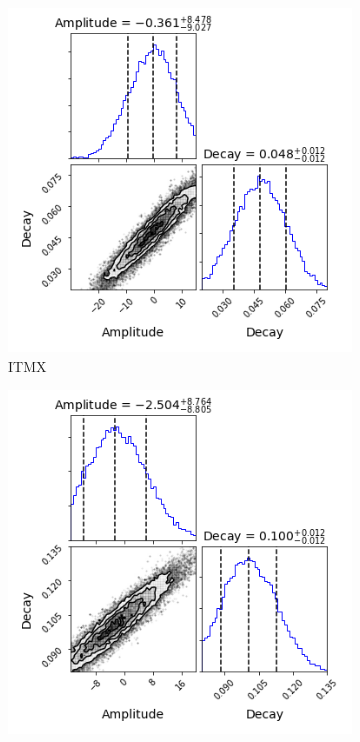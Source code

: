	\begin{figure}[!]
		\centering
		\begin{subfigure}[b]{0.5\textwidth}
			\includegraphics[width=\linewidth]{../Figures/MCMC_ITMX_abs.png}
			\caption{ITMX}
			\label{fig:mcmc_itmx_abs}
		\end{subfigure}%
		\begin{subfigure}[b]{0.5\textwidth}
			\includegraphics[width=\linewidth]{../Figures/MCMC_ITMY_abs.png}

\end{subfigure}
\end{figure}
